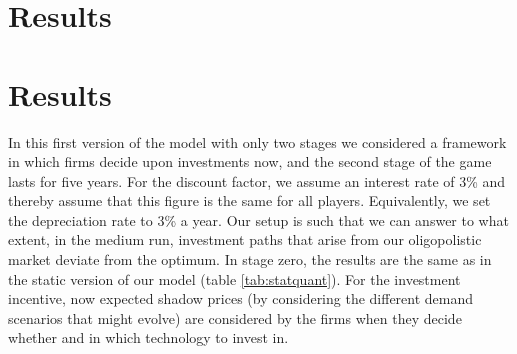 \section{Results} 

\section{Results}

In this first version of the model with only two stages we considered a framework in which firms decide upon investments now, and the second stage of the game lasts for five years. For the discount factor, we assume an interest rate of 3\% and thereby assume that this figure is the same for all players. Equivalently, we set the depreciation rate to 3\% a year. Our setup is such that we can answer to what extent, in the medium run, investment paths that arise from our oligopolistic market deviate from the optimum. In stage zero, the results are the same as in the static version of our model (table \ref{tab:statquant}). For the investment incentive, now expected shadow prices (by considering the different demand scenarios that might evolve) are considered by the firms when they decide whether and in which technology to invest in.

